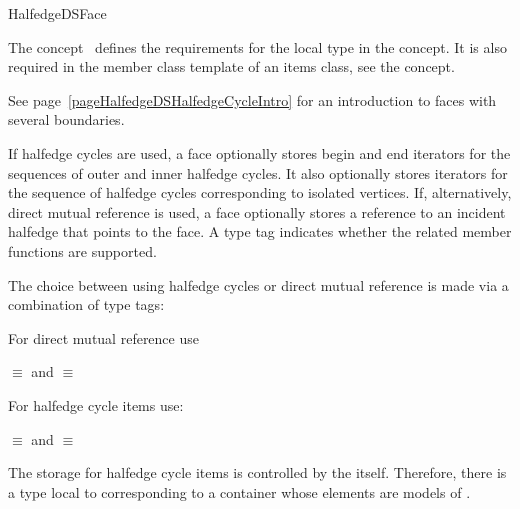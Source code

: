
\ccRefPageBegin



\begin{ccRefConcept}{HalfedgeDSFace}
\label{pageHalfedgeDSItemsFaceRef}

\ccDefinition
  
The concept \ccRefName\ defines the requirements for the local  
type in the  concept. It is also required in 
the  member class template of an
items class, see the  concept.

See page~\ref{pageHalfedgeDSHalfedgeCycleIntro} for an introduction to faces with several boundaries.

{
If halfedge cycles are used, a face optionally stores begin and end iterators for the  sequences
of outer and inner halfedge cycles. It also optionally stores iterators for the sequence of halfedge cycles 
corresponding to isolated vertices.
If, alternatively, direct mutual reference is used, a face optionally stores a reference 
to an incident halfedge that points to the face.
A type tag indicates whether the related member functions are supported. 
}

{

The choice between using halfedge cycles or direct mutual reference
is made via a combination of type tags:

For direct mutual reference use

 $\equiv$  
and
 $\equiv$  

For halfedge cycle items use:

 $\equiv$  
and
 $\equiv$  
 
}

\begin{ccAdvanced}
{
The storage for halfedge cycle items is controlled by the  itself. Therefore, 
there is a  type local to  corresponding to a 
container whose elements are models of .

}
\end{ccAdvanced}
\end{ccRefConcept}
